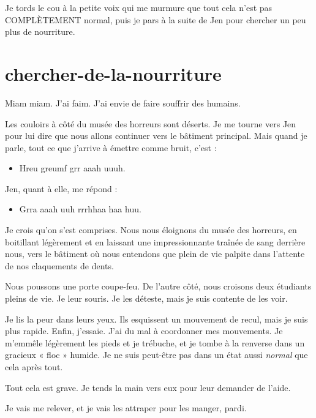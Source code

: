 Je tords le cou à la petite voix qui me murmure que tout cela n'est pas COMPLÈTEMENT normal, puis je pars à la suite de Jen pour chercher un peu plus de nourriture.


\section{chercher-de-la-nourriture}

Miam miam. J'ai faim. J'ai envie de faire souffrir des humains.

Les couloirs à côté du musée des horreurs sont déserts. Je me tourne vers Jen pour lui dire que nous allons continuer vers le bâtiment principal. Mais quand je parle, tout ce que j'arrive à émettre comme bruit, c'est :

\begin{itemize}
\item Hreu greumf grr aaah uuuh.
\end{itemize}

Jen, quant à elle, me répond :

\begin{itemize}
\item Grra aaah uuh rrrhhaa haa huu.
\end{itemize}

Je crois qu'on s'est comprises. Nous nous éloignons du musée des horreurs, en boitillant légèrement et en laissant une impressionnante traînée de sang derrière nous, vers le bâtiment où nous entendons que plein de vie palpite dans l'attente de nos claquements de dents.

Nous poussons une porte coupe-feu. De l'autre côté, nous croisons deux étudiants pleins de vie. Je leur souris. Je les déteste, mais je suis contente de les voir.

Je lis la peur dans leurs yeux. Ils esquissent un mouvement de recul, mais je suis plus rapide. Enfin, j'essaie. J'ai du mal à coordonner mes mouvements. Je m'emmêle légèrement les pieds et je trébuche, et je tombe à la renverse dans un gracieux « floc » humide. Je ne suis peut-être pas dans un état aussi \textit{normal} que cela après tout.

\item Tout cela est grave. Je tends la main vers eux pour leur demander de l'aide. 
\item Je vais me relever, et je vais les attraper pour les manger, pardi. 
\enw

